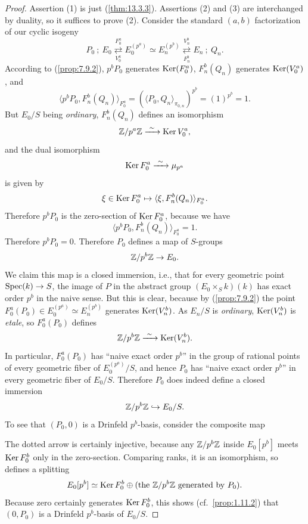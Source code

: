 \begin{proof}
Assertion (1) is just (\ref{thm:13.3.3}). Assertions (2) and (3) are interchanged by duality, so it suffices to prove (2). Consider the standard $(a,b)$ factorization of our cyclic isogeny
\[
P_0\ ;\ E_0 \overset{F_0^a}{\underset{V_0^a}{\rightleftarrows}} E_0^{(p^a)} \simeq E_n^{(p^b)} \overset{V_n^b}{\underset{F_n^b}{\rightleftarrows}} E_n\ ;\ Q_n .
\]
According to (\ref{prop:7.9.2}), $p^b P_0$ generates $\operatorname{Ker}(F_0^a)$, $F_n^b(Q_n)$ generates $\operatorname{Ker}(V_0^a)$, and
\[
\langle p^b P_0, F_n^b(Q_n) \rangle_{F_0^a} = (\langle P_0, Q_n \rangle_{\pi_{0,n}})^{p^b} = (1)^{p^b} = 1 .
\]
But $E_0/S$ being \emph{ordinary}, $F_n^b(Q_n)$ defines an isomorphism
\[
\mathbb{Z}/p^a\mathbb{Z} \xrightarrow{\ \sim\ } \operatorname{Ker} V_0^a ,
\]
and the dual isomorphism
\[
\operatorname{Ker} F_0^a \xrightarrow{\ \sim\ } \mu_{p^a}
\]
is given by
\[
\xi \in \operatorname{Ker} F_0^a \mapsto \langle \xi, F_n^b(Q_n) \rangle_{F_0^a} .
\]
Therefore $p^b P_0$ is the zero-section of $\operatorname{Ker} F_0^a$, because we have
\[
\langle p^b P_0, F_n^b(Q_n) \rangle_{F_0^a} = 1 .
\]
Therefore $p^b P_0 = 0$. Therefore $P_0$ defines a map of $S$-groups
\[
\mathbb{Z}/p^b\mathbb{Z} \to E_0 .
\]
We claim this map is a closed immersion, i.e., that for every geometric point $\operatorname{Spec}(k) \to S$, the image of $P$ in the abstract group $(E_0 \times_S k)(k)$ has exact order $p^b$ in the naive sense. But this is clear, because by (\ref{prop:7.9.2}) the point $F_0^a(P_0) \in E_0^{(p^a)} \simeq E_n^{(p^b)}$ generates $\operatorname{Ker}(V_n^b)$. As $E_n/S$ is \emph{ordinary}, $\operatorname{Ker}(V_n^b)$ is \emph{etale}, so $F_0^a(P_0)$ defines
\[
\mathbb{Z}/p^b\mathbb{Z} \xrightarrow{\ \sim\ } \operatorname{Ker}(V_n^b) .
\]
In particular, $F_0^a(P_0)$ has ``naive exact order $p^b$'' in the group of rational points of every geometric fiber of $E_0^{(p^a)}/S$, and hence $P_0$ has ``naive exact order $p^b$'' in every geometric fiber of $E_0/S$. Therefore $P_0$ does indeed define a closed immersion
\[
\mathbb{Z}/p^b\mathbb{Z} \hookrightarrow E_0/S .
\]
To see that $(P_0, 0)$ is a Drinfeld $p^b$-basis, consider the composite map
\begin{center}
\end{center}
The dotted arrow is certainly injective, because any $\mathbb{Z}/p^b\mathbb{Z}$ inside $E_0[p^b]$ meets $\operatorname{Ker} F_0^b$ only in the zero-section. Comparing ranks, it is an isomorphism, so defines a splitting
\[
E_0[p^b] \simeq \operatorname{Ker} F_0^b \oplus (\text{the } \mathbb{Z}/p^b\mathbb{Z} \text{ generated by } P_0) .
\]
Because zero certainly generates $\operatorname{Ker} F_0^b$, this shows (cf.\ \ref{prop:1.11.2}) that $(0, P_0)$ is a Drinfeld $p^b$-basis of $E_0/S$.


\end{proof}
